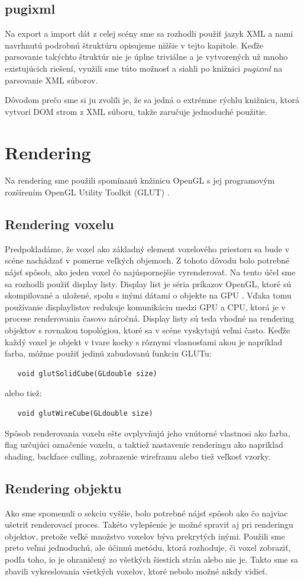 \subsection{pugixml}
Na export a import dát z celej scény sme sa rozhodli použiť jazyk XML a nami navrhnutú podrobnú štruktúru opisujeme nižšie v tejto kapitole. Keďže parsovanie takýchto štruktúr nie je úplne triviálne a je vytvorených už mnoho existujúcich riešení, využili sme túto možnosť a siahli po knižnici \textit{pugixml} \cite{pugixml} na parsovanie XML súborov.

Dôvodom prečo sme si ju zvolili je, že sa jedná o extrémne rýchlu knižnicu, ktorá vytvorí DOM strom z XML súboru, takže zaručuje jednoduché použitie.

\section{Rendering}
Na rendering sme použili spomínanú knžinicu OpenGL s jej programovým rozšírením OpenGL Utility Toolkit (GLUT) \cite{glut}.
\subsection{Rendering voxelu}
Predpokladáme, že voxel ako základný element voxelového priestoru sa bude v scéne nachádzať v pomerne veľkých objemoch. Z tohoto dôvodu bolo potrebné nájsť spôsob, ako jeden voxel čo najúspornejšie vyrenderovať.
Na tento účel sme sa rozhodli použiť display listy. Display list je séria príkazov OpenGL, ktoré sú skompilované a uložené, spolu s inými dátami o objekte na GPU \cite{DisplayList}.
Vďaka tomu používanie displaylistov redukuje komunikáciu medzi GPU a CPU, ktorá je v procese renderovania časovo náročná. Display listy sú teda vhodné na rendering objektov s rovnakou topológiou, ktoré sa v scéne vyskytujú veľmi často. Keďže každý voxel je objekt v tvare kocky s rôznymi vlasnosťami akou je napríklad farba, môžme použiť jedinú zabudovanú funkciu GLUTu: 
\begin{verbatim}
   void glutSolidCube(GLdouble size)
\end{verbatim}
alebo tiež:
\begin{verbatim}
   void glutWireCube(GLdouble size)
\end{verbatim}
Spôsob renderovania voxelu ešte ovplyvňujú jeho vnútorné vlastnosi ako farba, flag určujúci označenie voxelu, a taktiež nastavenie renderingu ako napríklad shading, backface culling, zobrazenie wireframu alebo tiež veľkosť vzorky.
\subsection{Rendering objektu}
Ako sme spomenuli o sekciu vyššie, bolo potrebné nájsť spôsob ako čo najviac ušetriť renderovací proces. Takéto vylepšenie je možné spraviť aj pri renderingu objektov, pretože veľké množstvo voxelov býva prekrytých inými. Použili sme preto veľmi jednoduchú, ale účinnú metódu, ktorá rozhoduje, či voxel zobraziť, podľa toho, io je ohraničený zo všetkých šiestich strán alebo nie je. Takto sme sa zbavili vykreslovania všetkých voxelov, ktoré nebolo možné nikdy vidieť.
